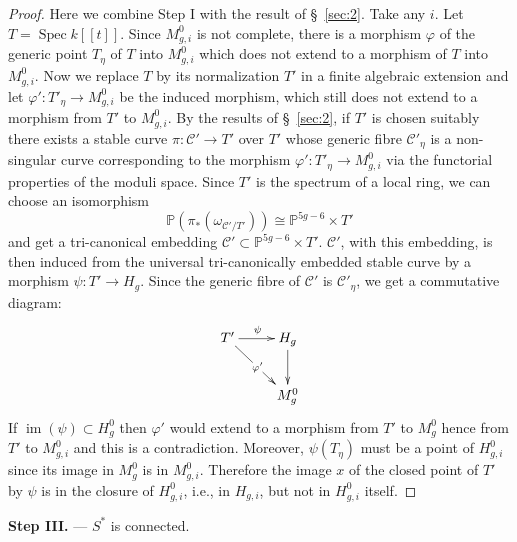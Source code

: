 \documentclass[10pt]{amsart}
\theoremstyle{plain}
\theoremstyle{definition}
\DeclareMathOperator{\Spec}{Spec}
\DeclareMathOperator{\im}{im}
\begin{document}
\begin{proof}
Here we combine Step I with the result of \S~\ref{sec:2}. Take any $i$. Let $T = \Spec k[[t]]$. Since $M_{g,i}^0$ is not complete, there is a morphism $\varphi$ of the generic point $T_\eta$ of $T$ into $M_{g,i}^0$ which does not extend to a morphism of $T$ into $M_{g,i}^0$. Now we replace $T$ by its normalization $T'$ in a finite algebraic extension and let $\varphi': T'_\eta \to M_{g,i}^0$ be the induced morphism, which still does not extend to a morphism from $T'$ to $M_{g,i}^0$. By the results of \S~\ref{sec:2}, if $T'$ is chosen suitably there exists a stable curve $\pi: \mathscr{C}' \to T'$ over $T'$ whose generic fibre $\mathscr{C}'_\eta$ is a non-singular curve corresponding to the morphism $\varphi': T'_\eta \to M_{g,i}^0$ via the functorial properties of the moduli space. Since $T'$ is the spectrum of a local ring, we can choose an isomorphism
\[
\mathbb{P}(\pi_*(\omega_{\mathscr{C}'/T'})) \cong \mathbb{P}^{5g-6} \times T'
\]
and get a tri-canonical embedding $\mathscr{C}' \subset \mathbb{P}^{5g-6} \times T'$. $\mathscr{C}'$, with this embedding, is then induced from the universal tri-canonically embedded stable curve by a morphism $\psi: T' \to H_g$. Since the generic fibre of $\mathscr{C}'$ is $\mathscr{C}'_\eta$, we get a commutative diagram:
\[
\xymatrix{
T' \ar[r]^\psi \ar[dr]|{\varphi'} & H_g \ar[d] \\
& M_g^0
}
\]
If $\im(\psi) \subset H_g^0$ then $\varphi'$ would extend to a morphism from $T'$ to $M_g^0$ hence from $T'$ to $M_{g,i}^0$ and this is a contradiction. Moreover, $\psi(T_\eta)$ must be a point of $H_{g,i}^0$ since its image in $M_g^0$ is in $M_{g,i}^0$. Therefore the image $x$ of the closed point of $T'$ by $\psi$ is in the closure of $H_{g,i}^0$, i.e., in $H_{g,i}$, but not in $H_{g,i}^0$ itself.
\end{proof}

\textbf{Step III.} --- $S^*$ is connected.
\end{document}
